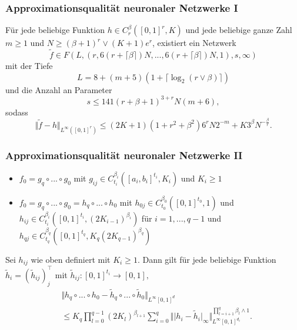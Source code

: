\documentclass[hyperref={pdfpagelabels=false}]{beamer}
\begin{document}
\begin{frame}
\frametitle{Approximationsqualität neuronaler Netzwerke \RN{1}}
\begin{small}
\begin{thm}
Für jede beliebige Funktion $h \in C_r^\beta ([0,1]^r, K)$ und jede beliebige ganze Zahl $m \geq 1$ und $N \geq (\beta + 1)^r \vee (K+1)e^r$, existiert ein Netzwerk 
\begin{equation*}
\widetilde{f} \in F (L, (r,6(r+\lceil\beta\rceil)N,..., 6(r+\lceil\beta\rceil)N, 1),s,\infty)
\end{equation*}
mit der Tiefe 
\begin{equation*}
L = 8 + (m + 5)(1+\lceil \log_2(r\vee \beta)\rceil)
\end{equation*}
und die Anzahl an Parameter 
\begin{equation*}
s \leq 141(r+\beta+1)^{3+r}N(m+6),
\end{equation*}
sodass 
\begin{equation*}
\Vert \widetilde{f} - h \Vert _{L^\infty([0,1]^r)} \leq (2K+1)(1+r^2+ \beta ^2)6^rN2^{-m}+K 3^\beta N^{- \frac{\beta}{r}}. 
\end{equation*}
\end{thm} 
\end{small}
\end{frame}


\begin{frame}
\frametitle{Approximationsqualität neuronaler Netzwerke \RN{2}}
\begin{itemize}
\item $f_0 = g_q \circ ... \circ g_0$ mit $g_{ij} \in C_{t_i}^{\beta_i} ([a_i,b_i]^{t_i}, K_i)$ und $K_i \geq 1$
\item $f_0 = g_q \circ ... \circ g_0 = h_q \circ ... \circ h_0$ mit \newline $h_{0j} \in C_{t_0} ^{\beta_0}([0,1]^{t_0},1)$ und \newline $ h_{ij} \in C_{t_i}^{\beta_i}([0,1]^{t_i},(2K_{i-1})^{\beta_i})$ für $ i = 1,..., q-1$ und $h_{qj} \in C_{t_	q} ^{\beta _q}([0,1]^{t_q}, K_q (2K_{q-1})^{\beta _q})$
\end{itemize}
\end{frame}

\begin{frame}
\begin{lemma}
Sei $h_{ij}$ wie oben definiert mit $K_i \geq 1$. Dann gilt für jede beliebige Funktion $\widetilde{h}_i = (\widetilde{h}_{ij})_j^\top$ mit $\widetilde{h}_{ij}:[0,1]^{t_i} \rightarrow [0,1],$
\begin{align*}
& \Vert h_q \circ ... \circ h_0 - \widetilde{h}_q \circ ... \circ \widetilde{h}_0 \Vert _{L^\infty [0,1]^d} \\
& \leq K_q  \prod\limits_{l=0}^{q-1} (2K_l)^{\beta _{l+1}} \sum\limits_{i=0}^{q} \Vert \vert h_i - \widetilde{h}_i \vert_\infty \Vert _{L^\infty[0,1]^{d_i}} ^{\prod_{l=i+1}^q \beta _l \wedge 1}. 
\end{align*}
\end{lemma} 
\end{frame}
\end{document}
